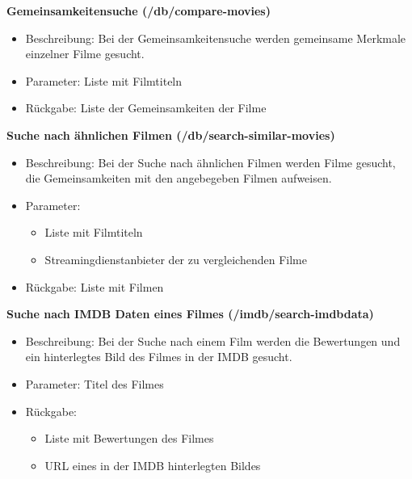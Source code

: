 \documentclass[conference]{IEEEtran}
\begin{document}
\smallskip

\textbf{Gemeinsamkeitensuche (/db/compare-movies)}
\begin{itemize}
\item Beschreibung:
    Bei der Gemeinsamkeitensuche werden gemeinsame Merkmale einzelner Filme gesucht.
\item Parameter:
    Liste mit Filmtiteln
\item Rückgabe:
    Liste der Gemeinsamkeiten der Filme
\end{itemize}

\smallskip

\textbf{Suche nach ähnlichen Filmen (/db/search-similar-movies)}
\begin{itemize}
\item Beschreibung:
    Bei der Suche nach ähnlichen Filmen werden Filme gesucht, die Gemeinsamkeiten mit den angebegeben Filmen aufweisen.
\item Parameter:
    \begin{itemize}
    \item Liste mit Filmtiteln
    \item Streamingdienstanbieter der zu vergleichenden Filme
    \end{itemize}
\item Rückgabe:
    Liste mit Filmen
\end{itemize}

\smallskip

\textbf{Suche nach IMDB Daten eines Filmes (/imdb/search-imdbdata)}
\begin{itemize}
\item Beschreibung:
    Bei der Suche nach einem Film werden die Bewertungen und ein hinterlegtes Bild des Filmes in der IMDB gesucht.
\item Parameter:
    Titel des Filmes
\item Rückgabe:
    \begin{itemize}
    \item Liste mit Bewertungen des Filmes
    \item URL eines in der IMDB hinterlegten Bildes
    \end{itemize}
\end{itemize}

\smallskip
\end{document}
